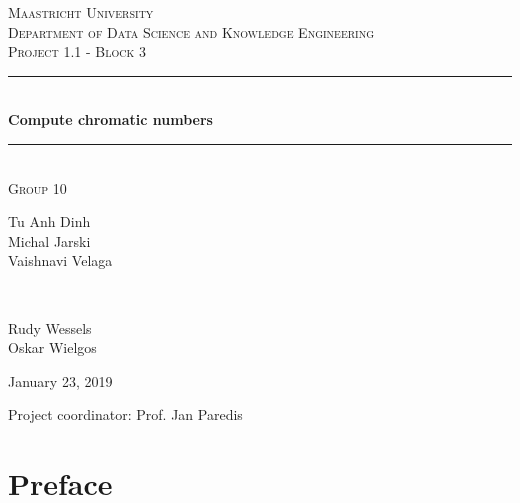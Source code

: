 \documentclass[a4paper]{report}
\begin{document}
	\begin{titlepage} 
		\newcommand{\HRule}{\rule{\linewidth}{0.5mm}} 
		
		\center
		
		\textsc{\LARGE Maastricht University}\\[1.5cm]
		
		\textsc{\Large Department of Data Science and Knowledge Engineering}\\[0.5cm] 
		
		\textsc{\large Project 1.1 - Block 3}\\[0.5cm] 
		
		\HRule\\[0.4cm]
		
		{\huge\bfseries Compute chromatic numbers}\\[0.4cm] 
		
		\HRule\\[1.5cm]
		
		\textsc{\large Group 10}\\[0.5cm]
		
		\begin{minipage}{0.6\textwidth}
			\begin{flushleft}
				Tu Anh Dinh\\Michal Jarski\\Vaishnavi Velaga
			\end{flushleft}
		\end{minipage}
		~
		\begin{minipage}{0.3\textwidth}
			\begin{flushleft}
				Rudy Wessels\\Oskar Wielgos\\
			\end{flushleft}
		\end{minipage}
	
		 \vspace{1cm}
		January 23, 2019
		\vspace{3cm}
		\begin{flushleft}
			Project coordinator: Prof. Jan Paredis
		\end{flushleft}
		
	\end{titlepage}
	
	\chapter*{Preface}
\end{document}
